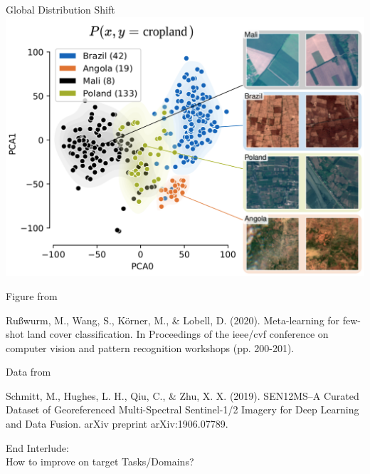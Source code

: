 \documentclass[11pt]{beamer}
\newcommand{\citeapa}[1]{ {\tiny#1\par} }
\begin{document}
	\begin{frame}{Global Distribution Shift}
		\includegraphics[width=.9\textwidth]{images/Sen12ms_distribution_shift}
		
		\scriptsize
		Figure from
		
		\citeapa{Rußwurm, M., Wang, S., Körner, M., \& Lobell, D. (2020). Meta-learning for few-shot land cover classification. In Proceedings of the ieee/cvf conference on computer vision and pattern recognition workshops (pp. 200-201).}
		
		\scriptsize
		Data from
		
		\citeapa{Schmitt, M., Hughes, L. H., Qiu, C., \& Zhu, X. X. (2019). SEN12MS--A Curated Dataset of Georeferenced Multi-Spectral Sentinel-1/2 Imagery for Deep Learning and Data Fusion. arXiv preprint arXiv:1906.07789.}
	\end{frame}


	\begin{frame}[plain]
		\centering
		\hfill
		\Large
		
		End Interlude: \\ 
		
		\vspace{1em}
		How to improve on target Tasks/Domains?
		\hfill
	\end{frame}
	
\end{document}
